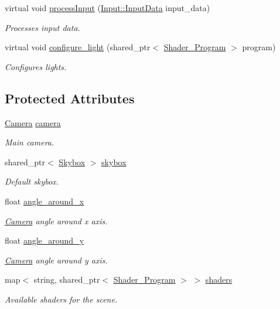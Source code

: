 \begin{DoxyCompactItemize}
virtual void \mbox{\hyperlink{classoglsl_1_1_scene_a7884a3f2b7900aaf348a62ad23223c8e}{process\+Input}} (\mbox{\hyperlink{classoglsl_1_1_input_a3b21d7328538e661f366af5d6059c197}{Input\+::\+Input\+Data}} input\+\_\+data)
\begin{DoxyCompactList}\small\item\em Processes input data. \end{DoxyCompactList}\item 
virtual void \mbox{\hyperlink{classoglsl_1_1_scene_a91c975ee306374f17b9f348801f2ce3e}{configure\+\_\+light}} (shared\+\_\+ptr$<$ \mbox{\hyperlink{classoglsl_1_1_shader___program}{Shader\+\_\+\+Program}} $>$ program)
\begin{DoxyCompactList}\small\item\em Configures lights. \end{DoxyCompactList}\end{DoxyCompactItemize}
\subsection*{Protected Attributes}
\begin{DoxyCompactItemize}
\item 
\mbox{\hyperlink{classoglsl_1_1_camera}{Camera}} \mbox{\hyperlink{classoglsl_1_1_scene_a272ee5697b5bb4bfb725cb07b944dec4}{camera}}
\begin{DoxyCompactList}\small\item\em Main camera. \end{DoxyCompactList}\item 
shared\+\_\+ptr$<$ \mbox{\hyperlink{classoglsl_1_1_skybox}{Skybox}} $>$ \mbox{\hyperlink{classoglsl_1_1_scene_af01c494a85900703fc19e5bb7c757ebc}{skybox}}
\begin{DoxyCompactList}\small\item\em Default skybox. \end{DoxyCompactList}\item 
float \mbox{\hyperlink{classoglsl_1_1_scene_a3acba5c9ee3e2712b142550f5f06c488}{angle\+\_\+around\+\_\+x}}
\begin{DoxyCompactList}\small\item\em \mbox{\hyperlink{classoglsl_1_1_camera}{Camera}} angle around x axis. \end{DoxyCompactList}\item 
float \mbox{\hyperlink{classoglsl_1_1_scene_af8751fb0147fb71a1f4d5a0ddf94b99e}{angle\+\_\+around\+\_\+y}}
\begin{DoxyCompactList}\small\item\em \mbox{\hyperlink{classoglsl_1_1_camera}{Camera}} angle around y axis. \end{DoxyCompactList}\item 
map$<$ string, shared\+\_\+ptr$<$ \mbox{\hyperlink{classoglsl_1_1_shader___program}{Shader\+\_\+\+Program}} $>$ $>$ \mbox{\hyperlink{classoglsl_1_1_scene_ac60cfa73f999218a5c801308d29d33eb}{shaders}}
\begin{DoxyCompactList}\small\item\em Available shaders for the scene. \end{DoxyCompactList}\end{DoxyCompactItemize}


